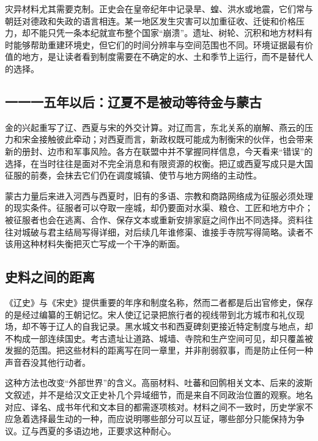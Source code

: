 灾异材料尤其需要克制。正史会在皇帝纪年中记录旱、蝗、洪水或地震，它们常与朝廷对德政和失政的语言相连。某一地区发生灾害可以加重征收、迁徙和价格压力，却不能只凭一条本纪就宣布整个国家“崩溃”。遗址、树轮、沉积和地方材料有时能够帮助重建环境史，但它们的时间分辨率与空间范围也不同。环境证据最有价值的地方，是让读者看到制度需要在不确定的水、土和季节上运行，而不是替代人的选择。

\subsection{一一一五年以后：辽夏不是被动等待金与蒙古}

金的兴起重写了辽、西夏与宋的外交计算。对辽而言，东北关系的崩解、燕云的压力和宋金接触彼此牵动；对西夏而言，新政权既可能成为制衡宋的伙伴，也会带来新的册封、边市和军事风险。各方在联盟中并不掌握同样信息，今天看来“错误”的选择，在当时往往是面对不完全消息和有限资源的权衡。把辽或西夏写成只是大国征服的前奏，会抹去它们仍在调度城镇、使节与地方网络的主动性。

蒙古力量后来进入河西与西夏时，旧有的多语、宗教和商路网络成为征服必须处理的现实条件。征服者可以夺取一座城，却仍要面对水渠、粮仓、工匠和地方中介；被征服者也会在逃离、合作、保存文本或重新安排家庭之间作出不同选择。资料往往对城破与君主结局写得详细，对后续几年谁修渠、谁接手寺院写得简略。读者不该用这种材料失衡把灭亡写成一个干净的断面。

\subsection{史料之间的距离}

《辽史》与《宋史》提供重要的年序和制度名称，然而二者都是后出官修史，保存的是经过编纂的王朝记忆。宋人使辽记录把旅行者的视线带到北方城市和礼仪现场，却不等于辽人的自我记录。黑水城文书和西夏碑刻更接近特定制度与地点，却不构成一部连续国史。考古遗址让道路、城墙、寺院和生产空间可见，却只覆盖被发掘的范围。把这些材料的距离写在同一章里，并非削弱叙事，而是防止任何一种声音吞没其他行动者。

这种方法也改变“外部世界”的含义。高丽材料、吐蕃和回鹘相关文本、后来的波斯文叙述，并不是给汉文正史补几个异域细节，而是来自不同政治位置的观察。地名对应、译名、成书年代和文本目的都需逐项核对。材料之间不一致时，历史学家不应急着选择最生动的一种，而应说明哪些部分可以互证，哪些部分只能保持为争议。辽与西夏的多语边地，正要求这种耐心。


